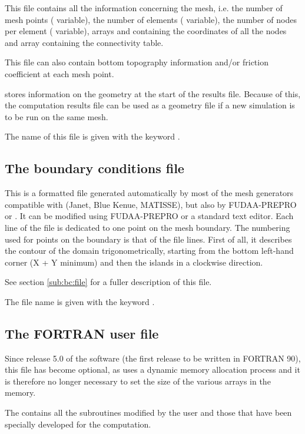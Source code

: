 This file contains all the information concerning the mesh,
i.e. the number of mesh points ( variable),
the number of elements ( variable),
the number of nodes per element ( variable),
arrays  and  containing the coordinates of all the nodes
and array  containing the connectivity table.

This file can also contain bottom topography information and/or
friction coefficient at each mesh point.

 stores information on the geometry at the start of the results file.
Because of this, the computation results file can be used as a geometry file
if a new simulation is to be run on the same mesh.

The name of this file is given with the keyword .


\subsection{The boundary conditions file}

This is a formatted file generated automatically by most of the mesh generators
compatible with \tel (Janet, Blue Kenue, MATISSE),
but also by FUDAA-PREPRO or \stbtel.
It can be modified using FUDAA-PREPRO or a standard text editor.
Each line of the file is dedicated to one point on the mesh boundary.
The numbering used for points on the boundary is that of the file lines.
First of all, it describes the contour of the domain trigonometrically,
starting from the bottom left-hand corner (X + Y minimum) and then the islands
in a clockwise direction.

See section \ref{sub:bc:file} for a fuller description of this file.

The file name is given with the keyword .


\subsection{The FORTRAN user file}
\label{subs:FORT:user:file}
Since release 5.0 of the software (the first release to be written in
FORTRAN 90), this file has become optional, as  uses
a dynamic memory allocation process and it is therefore no longer necessary
to set the size of the various arrays in the memory.

The  contains all the  subroutines modified
by the user and those that have been specially developed for the computation.

